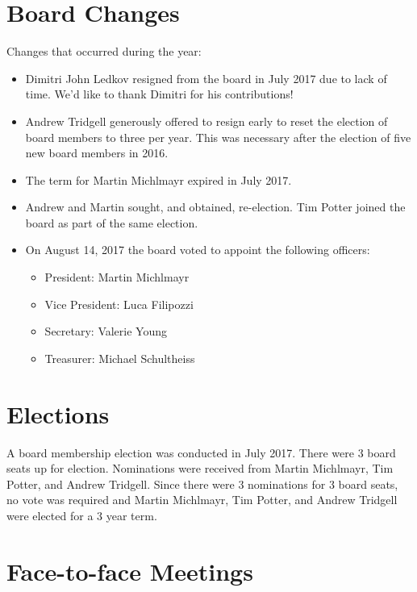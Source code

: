 \documentclass[a4paper]{report}
\begin{document}
\section{Board Changes}

Changes that occurred during the year:

\begin{itemize}

\item Dimitri John Ledkov resigned from the board in July 2017 due to lack
of time.  We'd like to thank Dimitri for his contributions!

\item Andrew Tridgell generously offered to resign early to reset the
election of board members to three per year. This was necessary after the
election of five new board members in 2016.

\item The term for Martin Michlmayr expired in July 2017.

\item Andrew and Martin sought, and obtained, re-election.  Tim Potter
joined the board as part of the same election.

\item On August 14, 2017 the board voted to appoint the following
officers:

\begin{itemize}
\item President: Martin Michlmayr
\item Vice President: Luca Filipozzi
\item Secretary: Valerie Young
\item Treasurer: Michael Schultheiss
\end{itemize}

\end{itemize}

\section{Elections}

A board membership election was conducted in July 2017.  There were 3 board
seats up for election.  Nominations were received from Martin Michlmayr,
Tim Potter, and Andrew Tridgell.  Since there were 3 nominations for 3
board seats, no vote was required and Martin Michlmayr, Tim Potter, and
Andrew Tridgell were elected for a 3 year term.

\section{Face-to-face Meetings}
\end{document}
